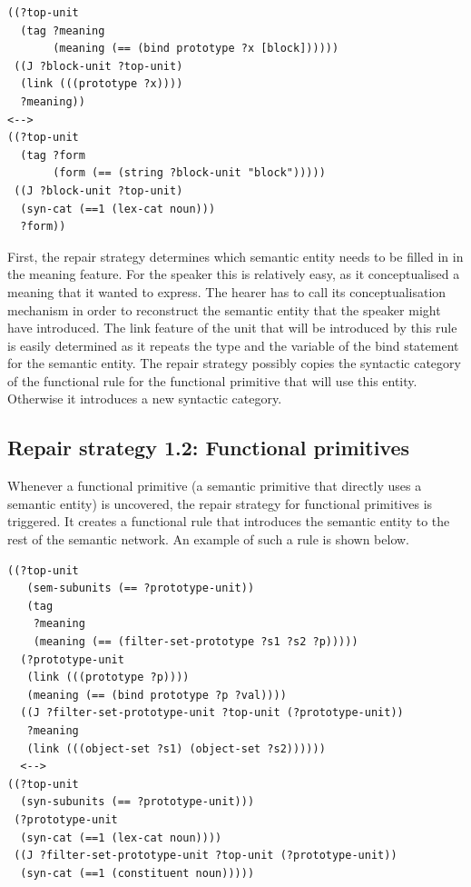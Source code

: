 \footnotesize
\begin{Verbatim}[frame=lines, label=Lexical rule for a block]
((?top-unit
  (tag ?meaning 
       (meaning (== (bind prototype ?x [block])))))
 ((J ?block-unit ?top-unit)
  (link (((prototype ?x))))
  ?meaning))
<-->
((?top-unit
  (tag ?form 
       (form (== (string ?block-unit "block")))))
 ((J ?block-unit ?top-unit) 
  (syn-cat (==1 (lex-cat noun)))
  ?form))
\end{Verbatim}
\normalsize

First, the repair strategy determines which semantic entity needs to
be filled in in the meaning feature. For the speaker this is
relatively easy, as it conceptualised a meaning that it wanted to
express. The hearer has to call its conceptualisation mechanism in
order to reconstruct the semantic entity that the speaker might have
introduced. The link feature of the unit that will be introduced by
this rule is easily determined as it repeats the type and the variable
of the bind statement for the semantic entity. The repair strategy
possibly copies the syntactic category of the functional rule for the
functional primitive that will use this entity. Otherwise it
introduces a new syntactic category.

\subsection{Repair strategy 1.2: Functional primitives}

Whenever a functional primitive (a semantic primitive that directly
uses a semantic entity) is uncovered, the repair strategy for
functional primitives is triggered. It creates a functional rule that
introduces the semantic entity to the rest of the semantic network. An
example of such a rule is shown below.

\footnotesize
\begin{Verbatim}[frame=lines, label=Functional rule for FILTER-SET-PROTOTYPE]
 ((?top-unit
   (sem-subunits (== ?prototype-unit))
   (tag
    ?meaning
    (meaning (== (filter-set-prototype ?s1 ?s2 ?p)))))
  (?prototype-unit
   (link (((prototype ?p))))
   (meaning (== (bind prototype ?p ?val))))
  ((J ?filter-set-prototype-unit ?top-unit (?prototype-unit))
   ?meaning
   (link (((object-set ?s1) (object-set ?s2))))))
  <-->
((?top-unit 
  (syn-subunits (== ?prototype-unit)))
 (?prototype-unit 
  (syn-cat (==1 (lex-cat noun))))
 ((J ?filter-set-prototype-unit ?top-unit (?prototype-unit))
  (syn-cat (==1 (constituent noun)))))
\end{Verbatim}
\normalsize

